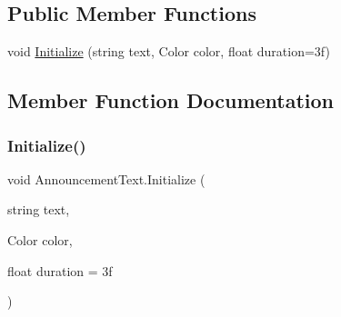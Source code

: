 \subsection*{Public Member Functions}
\begin{DoxyCompactItemize}
\item 
void \mbox{\hyperlink{class_announcement_text_a73025e6ac4349a61de65728eb1c926f9}{Initialize}} (string text, Color color, float duration=3f)
\end{DoxyCompactItemize}


\subsection{Member Function Documentation}
\mbox{\label{class_announcement_text_a73025e6ac4349a61de65728eb1c926f9}} 
\subsubsection{\texorpdfstring{Initialize()}{Initialize()}}
{\footnotesize\ttfamily void Announcement\+Text.\+Initialize (\begin{DoxyParamCaption}\item[{string}]{text,  }\item[{Color}]{color,  }\item[{float}]{duration = {\ttfamily 3f} }\end{DoxyParamCaption})}

